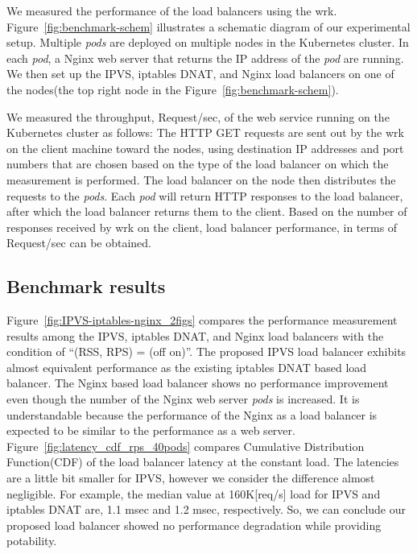 We measured the performance of the load balancers using the wrk.
Figure~\ref{fig:benchmark-schem} illustrates a schematic diagram of our experimental setup.
Multiple {\em pods} are deployed on multiple nodes in the Kubernetes cluster. 
In each {\em pod}, a Nginx web server that returns the IP address of the {\em pod} are running.
We then set up the IPVS, iptables DNAT, and Nginx load balancers on one of the nodes(the top right node in the Figure~\ref{fig:benchmark-schem}). 

We measured the throughput, Request/sec, of the web service running on the Kubernetes cluster as follows:
The HTTP GET requests are sent out by the wrk on the client machine toward the nodes,
using destination IP addresses and port numbers that are chosen based on the type of the load balancer on which the measurement is performed.
The load balancer on the node then distributes the requests to the {\em pods}.
Each {\em pod} will return HTTP responses to the load balancer, after which the load balancer returns them to the client.
Based on the number of responses received by wrk on the client, 
load balancer performance, in terms of Request/sec can be obtained. 

\subsection{Benchmark results}

Figure~\ref{fig:IPVS-iptables-nginx_2figs} compares the performance measurement results 
among the IPVS, iptables DNAT, and Nginx load balancers
with the condition of \enquote{(RSS, RPS) = (off on)}.
The proposed IPVS load balancer exhibits almost equivalent performance as the existing iptables DNAT based load balancer. 
The Nginx based load balancer shows no performance improvement even though the number of the Nginx web server {\em pods} is increased.
It is understandable because the performance of the Nginx as a load balancer is expected to be similar to the performance as a web server.
Figure~\ref{fig:latency_cdf_rps_40pods} compares Cumulative Distribution Function(CDF) of the load balancer latency at the constant load.
The latencies are a little bit smaller for IPVS, however we consider the difference almost negligible.
For example, the median value at 160K[req/s] load for IPVS and iptables DNAT are, 1.1 msec and 1.2 msec, respectively.
So, we can conclude our proposed load balancer showed no performance degradation while providing potability.

